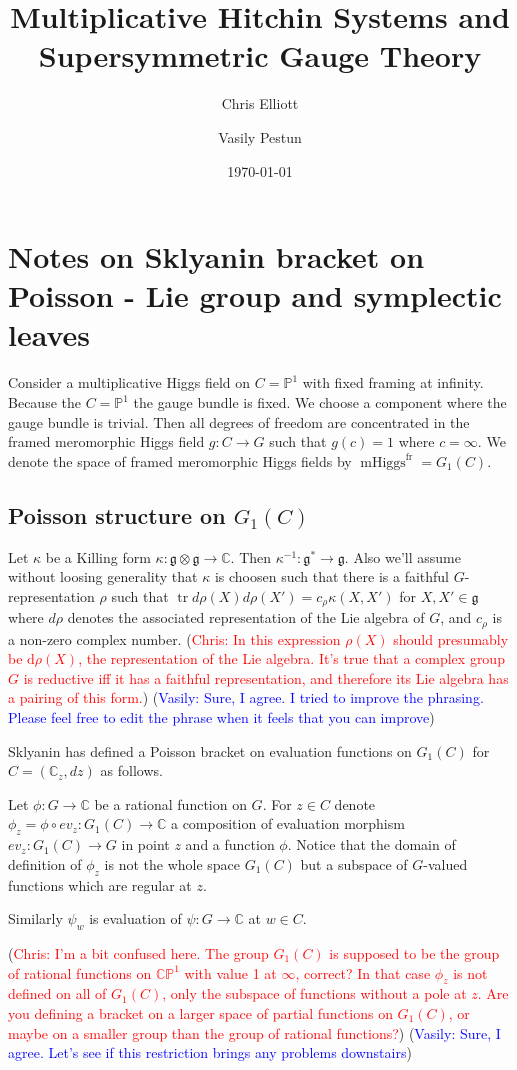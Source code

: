 \documentclass[11pt, oneside, reqno]{amsart}
\title{Multiplicative Hitchin Systems and Supersymmetric Gauge Theory}
\author{Chris Elliott \and Vasily Pestun}
\date{\today}
\theoremstyle{definition} \newtheorem{definition}{Definition}[section]
\theoremstyle{definition} \newtheorem{remark}[definition]{Remark}
\theoremstyle{definition} \newtheorem{remarks}[definition]{Remarks}
\theoremstyle{definition} \newtheorem{question}[definition]{Question}
\theoremstyle{definition} \newtheorem*{note}{Note}
\theoremstyle{definition} \newtheorem{example}[definition]{Example}
\theoremstyle{definition} \newtheorem{examples}[definition]{Examples}
\renewcommand{\gg}{\mathfrak{g}}
\newcommand{\bb}[1]{\mathbb{#1}}
\DeclareMathOperator{\tr}{tr}
\DeclareMathOperator{\mhiggs}{mHiggs}
\renewcommand{\d}{\mathrm{d}}
\newcommand{\fr}{\mathrm{fr}}
\newcommand{\chris}[1]{(\textcolor{red}{Chris: #1})}
\newcommand{\vasily}[1]{(\textcolor{blue}{Vasily: #1})}
\begin{document}
\section{Notes on Sklyanin bracket on Poisson - Lie group
  and symplectic leaves}

Consider a multiplicative Higgs field on $C = \mathbb{P}^{1}$
with fixed framing at infinity. Because the $C = \mathbb{P}^{1}$ the
gauge bundle is fixed. We choose a component where the gauge bundle is trivial.
Then all degrees of freedom are concentrated
in the framed meromorphic Higgs field $g: C \to G$ such that $g(c) = 1$ where $c = \infty$. We denote
the space of framed meromorphic Higgs fields by $\mhiggs^{\fr} = G_1(C)$. 

\subsection{Poisson structure on $G_1(C)$} 
Let $\kappa$ be a Killing form $\kappa: \gg \otimes \gg \to \mathbb{C}$.
Then $\kappa^{-1}: \gg^{*} \to \gg$. Also we'll assume  without loosing generality that $\kappa$ is choosen such that
there is a faithful $G$-representation $\rho$ such that 
$\tr d\rho(X) d\rho(X') = c_\rho \kappa(X, X') $ for $X , X' \in \gg$
where $d\rho$ denotes the associated representation of the Lie algebra of $G$,
and $c_{\rho}$ is a non-zero complex number.  \chris{In this expression $\rho(X)$ should presumably be $\d \rho(X)$, the representation of the Lie algebra.  It's true that a complex group $G$ is reductive iff it has a faithful representation, and therefore its Lie algebra has a pairing of this form.}
\vasily{Sure, I agree. I tried to improve the phrasing.
  Please feel free to edit the phrase when it feels that you can
  improve} 

Sklyanin has defined a Poisson bracket on evaluation functions on $G_1(C)$ for $C = (\mathbb{C}_z, dz)$ as follows. 

Let $\phi: G \to \mathbb{C}$ be a rational function on $G$.
For $z \in C$ denote $\phi_{z} =  \phi \circ ev_{z} : G_1(C) \to \mathbb{C}$ a composition of evaluation morphism  $ev_{z}: G_1(C) \to G$ in point $z$ and a function $\phi$. Notice that the domain of definition of
$\phi_{z}$ is not the whole space $G_{1}(C)$ but a subspace of
$G$-valued functions which are regular at $z$. 

Similarly $\psi_{w}$ is evaluation of $\psi: G \to \mathbb{C}$ at $w \in C$. 

\chris{I'm a bit confused here.  The group $G_1(C)$ is supposed to be the group of rational functions on $\bb{CP}^1$ with value 1 at $\infty$, correct?  In that case $\phi_z$ is not defined on all of $G_1(C)$, only the subspace of functions without a pole at $z$.  Are you defining a bracket on a larger space of partial functions on $G_1(C)$, or maybe on a smaller group than the group of rational functions?}
\vasily{Sure, I agree. Let's see if this restriction brings any problems downstairs}
\end{document}
